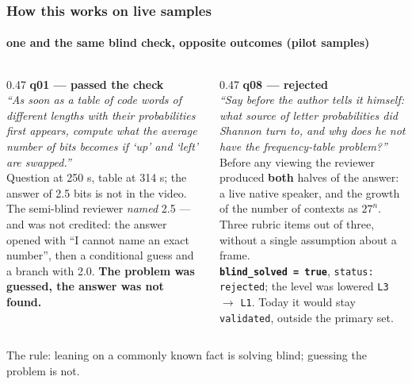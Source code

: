 \documentclass[aspectratio=169,10pt]{beamer}
\newcommand{\lead}[1]{{\color{warm}\textbf{#1}}}
\begin{document}
\begin{frame}
  \frametitle{How this works on live samples}
  \framesubtitle{one and the same blind check, opposite outcomes (pilot samples)}

  \begin{columns}[T]
    \begin{column}{0.47\textwidth}
      {\color{accent}\bfseries q01 — passed the check}\\[0.4em]
      {\small
      \emph{``As soon as a table of code words of different lengths with their probabilities
      first appears, compute what the average number of bits becomes if `up' and `left'
      are swapped.''}\\[0.5em]
      Question at 250 s, table at 314 s; the answer of 2.5 bits is not in the video.\\[0.5em]
      The semi-blind reviewer \emph{named} 2.5 — and was not credited: the answer opened with
      ``I cannot name an exact number'', then a conditional guess and a branch with 2.0.
      \lead{The problem was guessed, the answer was not found.}}
    \end{column}
    \begin{column}{0.47\textwidth}
      {\color{warm}\bfseries q08 — rejected}\\[0.4em]
      {\small
      \emph{``Say before the author tells it himself: what source of letter probabilities
      did Shannon turn to, and why does he not have the frequency-table problem?''}\\[0.5em]
      Before any viewing the reviewer produced \textbf{both} halves of the answer: a live
      native speaker, and the growth of the number of contexts as $27^n$. Three rubric items
      out of three, without a single assumption about a frame.\\[0.5em]
      \lead{\texttt{blind\_solved = true}}, \texttt{status: rejected}; the level was lowered
      \texttt{L3} $\rightarrow$ \texttt{L1}. Today it would stay \texttt{validated}, outside the primary set.}
    \end{column}
  \end{columns}

  \vspace{0.2em}
  {\color{muted}\footnotesize The rule: leaning on a commonly known fact is solving blind; guessing the problem is not.}
\end{frame}
\end{document}
